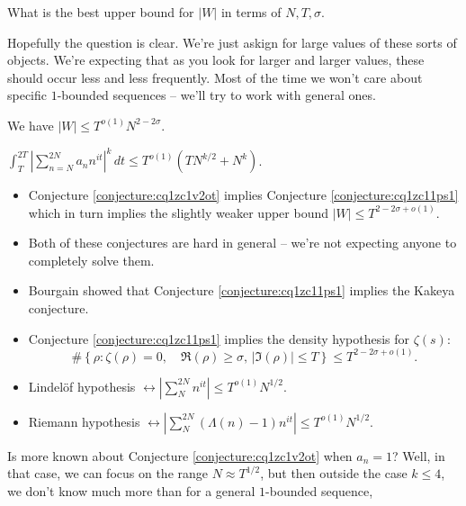 \documentclass[reqno]{amsart} 
\numberwithin{theorem}{section}
\numberwithin{equation}{section}
\begin{document}
\begin{question}\label{question:cq1zc10h0l}
  What is the best upper bound for $\lvert W \rvert$ in terms of $N, T, \sigma$.
\end{question}

Hopefully the question is clear.  We're just askign for large values of these sorts of objects.  We're expecting that as you look for larger and larger values, these should occur less and less frequently.  Most of the time we won't care about specific $1$-bounded sequences -- we'll try to work with general ones.

\begin{conjecture}[Montgomery]\label{conjecture:cq1zc1v2ot}
  We have $\lvert W \rvert \leq T^{o(1)} N^{2 - 2 \sigma}$.
\end{conjecture}

\begin{conjecture}[Montgomery] \label{conjecture:cq1zc11ps1}
  $\int_T^{2 T} \left\lvert \sum_{n = N}^{2 N} a_n n^{i t} \right\rvert^k \, d t \leq T^{o(1)} \left( T N^{k/2} + N^k\right)$.
\end{conjecture}
\begin{itemize}
\item Conjecture \ref{conjecture:cq1zc1v2ot} implies Conjecture \ref{conjecture:cq1zc11ps1} which in turn implies the slightly weaker upper bound $\lvert W \rvert \leq T^{2 - 2 \sigma + o(1)}$.
\item Both of these conjectures are hard in general -- we're not expecting anyone to completely solve them.
\item Bourgain showed that Conjecture \ref{conjecture:cq1zc11ps1} implies the Kakeya conjecture.
\item Conjecture \ref{conjecture:cq1zc11ps1} implies the density hypothesis for $\zeta(s)$:
  \begin{equation*}
    \# \left\{ \rho : \zeta(\rho) = 0, \quad \Re(\rho) \geq \sigma, \, \lvert \Im(\rho) \rvert \leq T \right\}
    \leq T^{2 - 2 \sigma + o(1)}.
  \end{equation*}
\item Lindelöf hypothesis $\leftrightarrow \left\lvert \sum_{N}^{2 N} n^{i t} \right\rvert \leq T^{o(1)} N^{1/2}$.
\item Riemann hypothesis $\leftrightarrow \left\lvert \sum_{N}^{2 N}(\Lambda(n) - 1) n^{i t} \right\rvert \leq T^{o(1)} N^{1/2}$.
\end{itemize}

\begin{remark}
  Is more known about Conjecture \ref{conjecture:cq1zc1v2ot} when $a_n = 1$?  Well, in that case, we can focus on the range $N \approx T^{1/2}$, but then outside the case $k \leq 4$, we don't know much more than for a general $1$-bounded sequence,
\end{remark}
\end{document}
